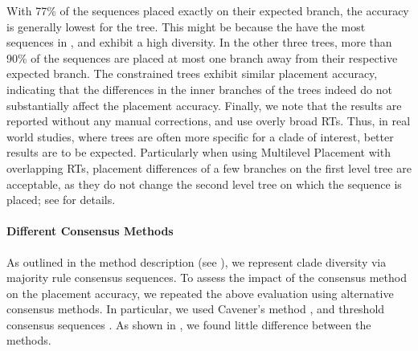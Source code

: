 With 77\% of the sequences placed exactly on their expected branch,
the accuracy is generally lowest for the  tree.
This might be because the  have the most sequences in , and exhibit a high diversity.
In the other three trees, more than 90\% of the sequences are placed
at most one branch away from their respective expected branch.
The constrained trees exhibit similar placement accuracy,
indicating that the differences in the inner branches of the trees indeed do not substantially affect the placement accuracy.
Finally, we note that the results are reported without any manual corrections, and use overly broad \acp{RT}.
Thus, in real world studies, where trees are often more specific for a clade of interest,
better results are to be expected.
Particularly when using Multilevel Placement with overlapping \acp{RT},
placement differences of a few branches on the first level tree are acceptable,
as they do not change the second level tree on which the sequence is placed;
see  for details.

\paragraph{Different Consensus Methods}
\label{ch:AutomaticTrees:sec:Evaluation:sub:Accuracy:par:ConsensusMethods}

As outlined in the method description (see ),
we represent clade diversity via majority rule consensus sequences.
To assess the impact of the consensus method on the placement accuracy,
we repeated the above evaluation using alternative consensus methods.
In particular, we used Cavener's method \citep{Cavener1987,Cavener1991a},
and threshold consensus sequences \citep{Day1992a,Day1992}.
As shown in , we found little difference between the methods.

